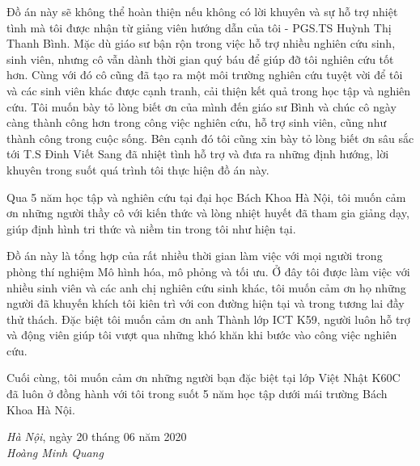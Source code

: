 Đồ án này sẽ không thể hoàn thiện nếu không có lời khuyên và sự hỗ trợ nhiệt tình mà tôi được nhận từ giảng viên hướng dẫn của tôi - PGS.TS Huỳnh Thị Thanh Bình. Mặc dù giáo sư bận rộn trong việc hỗ trợ nhiều nghiên cứu sinh, sinh viên, nhưng cô vẫn dành thời gian quý báu để giúp đỡ tôi nghiên cứu tốt hơn. Cùng với đó cô cũng đã tạo ra một môi trường nghiên cứu tuyệt vời để tôi và các sinh viên khác được cạnh tranh, cải thiện kết quả trong học tập và nghiên cứu. Tôi muốn bày tỏ lòng biết ơn của mình đến giáo sư Bình và chúc cô ngày càng thành công hơn trong công việc nghiên cứu, hỗ trợ sinh viên, cũng như thành công trong cuộc sống. Bên cạnh đó tôi cũng xin bày tỏ lòng biết ơn sâu sắc tới T.S Đinh Viết Sang đã nhiệt tình hỗ trợ và đưa ra những định hướng, lời khuyên trong suốt quá trình tôi thực hiện đồ án này.

Qua 5 năm học tập và nghiên cứu tại đại học Bách Khoa Hà Nội, tôi muốn cảm ơn những người thầy cô với kiến thức và lòng nhiệt huyết đã tham gia giảng dạy, giúp định hình tri thức và niềm tin trong tôi như hiện tại.

Đồ án này là tổng hợp của rất nhiều thời gian làm việc với mọi người trong phòng thí nghiệm Mô hình hóa, mô phỏng và tối ưu. Ở đây tôi được làm việc với nhiều sinh viên và các anh chị nghiên cứu sinh khác, tôi muốn cảm ơn họ những người đã khuyến khích tôi kiên trì với con đường hiện tại và trong tương lai đầy thử thách. Đặc biệt tôi muốn cảm ơn anh Thành lớp ICT K59, người luôn hỗ trợ và động viên giúp tôi vượt qua những khó khăn khi bước vào công việc nghiên cứu.

Cuối cùng, tôi muốn cảm ơn những người bạn đặc biệt tại lớp Việt Nhật K60C đã luôn ở đồng hành với tôi trong suốt 5 năm học tập dưới mái trường Bách Khoa Hà Nội. 

\begin{flushright}
\begin{minipage}[t]{0.5\textwidth}
\begin{center}
  \textit{Hà Nội}, ngày 20 tháng 06 năm 2020\\
  
  \textit{Hoàng Minh Quang}
\end{center}
\end{minipage}
\end{flushright}

\pagebreak